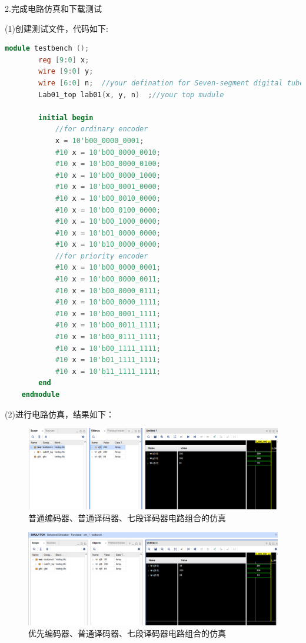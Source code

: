 \documentclass[UTF8,fontset=fandol]{ctexart}
\begin{document}
2.完成电路仿真和下载测试

(1)创建测试文件，代码如下:
\begin{lstlisting}[language=Verilog,keywordstyle=\color{red!70}]
    module testbench ();
        reg [9:0] x;
        wire [9:0] y;
        wire [6:0] n;  //your defination for Seven-segment digital tube
        Lab01_top lab01(x, y, n)  ;//your top mudule
    
        initial begin
            //for ordinary encoder
            x = 10'b00_0000_0001;  
            #10 x = 10'b00_0000_0010;
            #10 x = 10'b00_0000_0100;  
            #10 x = 10'b00_0000_1000;
            #10 x = 10'b00_0001_0000;  
            #10 x = 10'b00_0010_0000;
            #10 x = 10'b00_0100_0000;  
            #10 x = 10'b00_1000_0000;
            #10 x = 10'b01_0000_0000;  
            #10 x = 10'b10_0000_0000;
            //for priority encoder
            #10 x = 10'b00_0000_0001;
            #10 x = 10'b00_0000_0011;
            #10 x = 10'b00_0000_0111;
            #10 x = 10'b00_0000_1111;
            #10 x = 10'b00_0001_1111;
            #10 x = 10'b00_0011_1111; 
            #10 x = 10'b00_0111_1111; 
            #10 x = 10'b00_1111_1111;
            #10 x = 10'b01_1111_1111;
            #10 x = 10'b11_1111_1111;  
        end
    endmodule
\end{lstlisting}
(2)进行电路仿真，结果如下：

\begin{figure}[H]
    \centering
    \includegraphics[scale=0.6]{Snipaste_2021-11-04_13-27-55.png}
    \caption{普通编码器、普通译码器、七段译码器电路组合的仿真}
\end{figure}

\begin{figure}[H]
    \centering
    \includegraphics[scale=0.6]{Snipaste_2021-11-04_13-31-12.png}
    \caption{优先编码器、普通译码器、七段译码器电路组合的仿真}
\end{figure}
\end{document}
